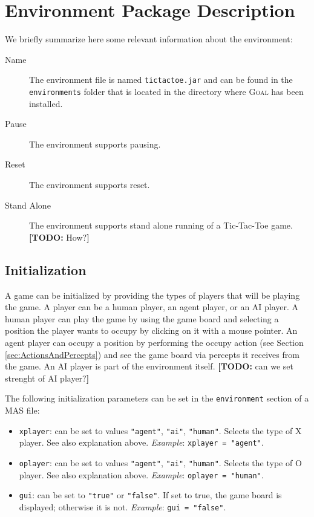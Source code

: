 \documentclass{article}
\newcommand{\GOAL}{\textsc{Goal}\xspace}
\newcommand{\todo}[1]{\textbf{[TODO: }#1\textbf{]}}
\begin{document}
%
%
%
\section{Environment Package Description}\label{sec:environmentPackage}
%

We briefly summarize here some relevant information about the environment:
\begin{description}
	\item[Name] The environment file is named \texttt{tictactoe.jar} and can be found in the \texttt{environments} folder that is located in the directory where \GOAL has been installed.
	\item[Pause] The environment supports pausing.
	\item[Reset] The environment supports reset.
	\item[Stand Alone] The environment supports stand alone running of a Tic-Tac-Toe game. \todo{How?}
\end{description}

%
%
\subsection{Initialization}\label{sec:initialization}
%

A game can be initialized by providing the types of players that will be playing the game. A player can be a human player, an agent player, or an AI player. A human player can play the game by using the game board and selecting a position the player wants to occupy by clicking on it with a mouse pointer. An agent player can occupy a position by performing the occupy action (see Section \ref{sec:ActionsAndPercepts}) and see the game board via percepts it receives from the game. An AI player is part of the environment itself. \todo{can we set strenght of AI player?}


The following initialization parameters can be set in the \texttt{environment} section of a MAS file:
\begin{graybox}
\begin{itemize}
	\item \texttt{xplayer}: can be set to values \texttt{"agent"}, \texttt{"ai"}, \texttt{"human"}. Selects the type of X player. See also explanation above. \textit{Example}: \texttt{xplayer = "agent"}.
	\item \texttt{oplayer}: can be set to values \texttt{"agent"}, \texttt{"ai"}, \texttt{"human"}. Selects the type of O player. See also explanation above. \textit{Example}: \texttt{oplayer = "human"}.
	\item \texttt{gui}: can be set to \texttt{"true"} or \texttt{"false"}. If set to true, the game board is displayed; otherwise it is not. \textit{Example}: \texttt{gui = "false"}.
\end{itemize}
\end{graybox}
 
\end{document}
